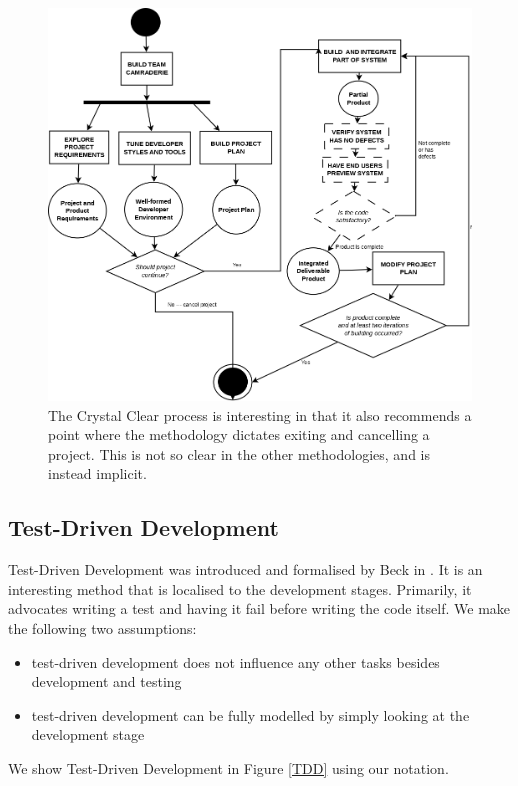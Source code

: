 \begin{figure}
	\centering
	\includegraphics[scale=0.3]{media/Crystal}
	\caption{The Crystal Clear process is interesting in that it also recommends a point where the
		methodology dictates exiting and cancelling a project. This is not so clear in the other
			methodologies, and is instead implicit.}
	\label{CrystalClean}
\end{figure}

\subsection{Test-Driven Development}

Test-Driven Development was introduced and formalised by Beck in \cite{Beck:2002:TDD:579193}.
It is an interesting method that is localised to the development stages.
Primarily, it advocates writing a test and having it fail before writing the code itself.
We make the following two assumptions:
\begin{itemize}
	\item test-driven development does not influence any other tasks besides development and testing
	\item test-driven development can be fully modelled by simply looking at the development stage
\end{itemize}

We show Test-Driven Development in Figure \ref{TDD} using our notation.

